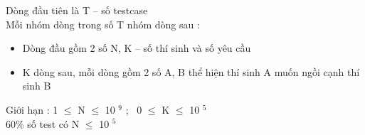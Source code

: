 Dòng đầu tiên là T – số testcase
\\Mỗi nhóm dòng trong số T nhóm dòng sau :
\begin{itemize}
	\item Dòng đầu gồm 2 số N, K – số thí sinh và số yêu cầu
	\item K dòng sau, mỗi dòng gồm 2 số A, B thể hiện thí sinh A muốn ngồi cạnh thí sinh B
\end{itemize}

Giới hạn : 1  $\le$  N  $\le$  10 $^ 9 $ ;  0  $\le$  K  $\le$  10 $^ 5 $
\\60\% số test có N  $\le$  10 $^ 5 $